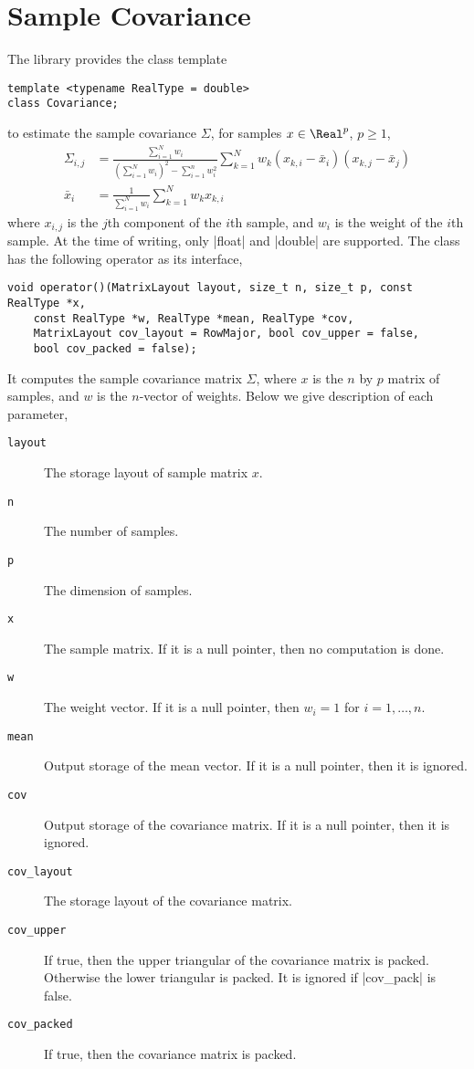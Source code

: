 \section{Sample Covariance}
\label{sec:Sample Covariance}

The library provides the class template
\begin{verbatim}
template <typename RealType = double>
class Covariance;
\end{verbatim}
to estimate the sample covariance $\Sigma$, for samples $x\in\Real^p$, $p\ge1$,
\begin{align*}
  \Sigma_{i,j} &= \frac{\sum_{i=1}^N w_i}
  {(\sum_{i=1}^N w_i)^2 - \sum_{i=1}^n w_i^2}
  \sum_{k=1}^N w_k (x_{k,i} - \bar{x}_i)(x_{k,j} - \bar{x}_j) \\
  \bar{x}_i &= \frac{1}{\sum_{i=1}^N w_i}\sum_{k=1}^N w_k x_{k,i}
\end{align*}
where $x_{i,j}$ is the $j$th component of the $i$th sample, and $w_i$ is the
weight of the $i$th sample. At the time of writing, only |float| and |double|
are supported. The class has the following operator as its interface,
\begin{verbatim}
void operator()(MatrixLayout layout, size_t n, size_t p, const RealType *x,
    const RealType *w, RealType *mean, RealType *cov,
    MatrixLayout cov_layout = RowMajor, bool cov_upper = false,
    bool cov_packed = false);
\end{verbatim}
It computes the sample covariance matrix $\Sigma$,
where $x$ is the $n$ by $p$ matrix of samples, and $w$ is the $n$-vector of
weights. Below we give description of each parameter,
\begin{description}
  \item[\texttt{layout}] The storage layout of sample matrix $x$.
  \item[\texttt{n}] The number of samples.
  \item[\texttt{p}] The dimension of samples.
  \item[\texttt{x}] The sample matrix. If it is a null pointer, then no
    computation is done.
  \item[\texttt{w}] The weight vector. If it is a null pointer, then $w_i = 1$
    for $i = 1,\dots,n$.
  \item[\texttt{mean}] Output storage of the mean vector. If it is a null
    pointer, then it is ignored.
  \item[\texttt{cov}] Output storage of the covariance matrix. If it is a null
    pointer, then it is ignored.
  \item[\texttt{cov\_layout}] The storage layout of the covariance matrix.
  \item[\texttt{cov\_upper}] If true, then the upper triangular of the
    covariance matrix is packed. Otherwise the lower triangular is packed. It
    is ignored if |cov_pack| is false.
  \item[\texttt{cov\_packed}] If true, then the covariance matrix is
    packed.
\end{description}
